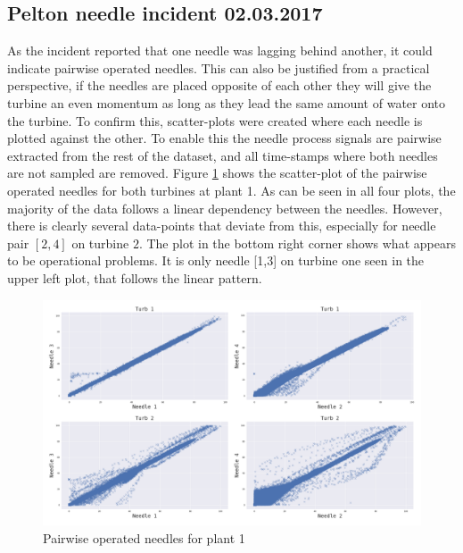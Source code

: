     \subsection{Pelton needle incident 02.03.2017}
        As the incident reported that one needle was lagging behind another, it could indicate pairwise operated needles. This can also be justified from a practical perspective, if the needles are placed opposite of each other they will give the turbine an even momentum as long as they lead the same amount of water onto the turbine. To confirm this, scatter-plots were created where each needle is plotted against the other. To enable this the needle process signals are pairwise extracted from the rest of the dataset, and all time-stamps where both needles are not sampled are removed. Figure \ref{fig:plant1_needles} shows the scatter-plot of the pairwise operated needles for both turbines at plant 1. As can be seen in all four plots, the majority of the data follows a linear dependency between the needles. However, there is clearly several data-points that deviate from this, especially for needle pair $[2,4]$ on turbine $2$. The plot in the bottom right corner shows what appears to be operational problems. It is only needle [1,3] on turbine one seen in the upper left plot, that follows the linear pattern.
        \begin{figure}[h]
            \centering
            \includegraphics[width=\textwidth]{report/figures/data/plant1_needles.png}
            \caption{Pairwise operated needles for plant 1}
            \label{fig:plant1_needles}
        \end{figure}
        
